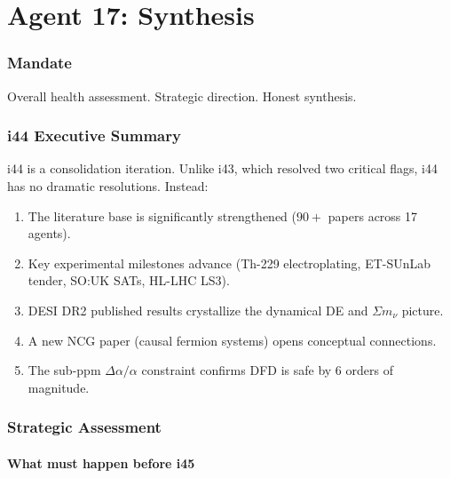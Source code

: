 \documentclass[11pt,a4paper]{article}
\begin{document}
\part{Agent 17: Synthesis}
\label{part:agent17}

\section{Mandate}

Overall health assessment. Strategic direction. Honest synthesis.

\section{i44 Executive Summary}

\begin{tcolorbox}[colback=green!5!white, colframe=green!60!black,
  title={i44: Consolidation Iteration --- No New Resolutions, Strong Literature}]

i44 is a consolidation iteration. Unlike i43, which resolved two critical flags, i44 has no dramatic resolutions. Instead:
\begin{enumerate}
\item The literature base is significantly strengthened ($90+$ papers across 17 agents).
\item Key experimental milestones advance (Th-229 electroplating, ET-SUnLab tender, SO:UK SATs, HL-LHC LS3).
\item DESI DR2 published results crystallize the dynamical DE and $\Sigma m_\nu$ picture.
\item A new NCG paper (causal fermion systems) opens conceptual connections.
\item The sub-ppm $\Delta\alpha/\alpha$ constraint confirms DFD is safe by 6 orders of magnitude.
\end{enumerate}
\end{tcolorbox}

\section{Strategic Assessment}

\subsection{What must happen before i45}
\end{document}
